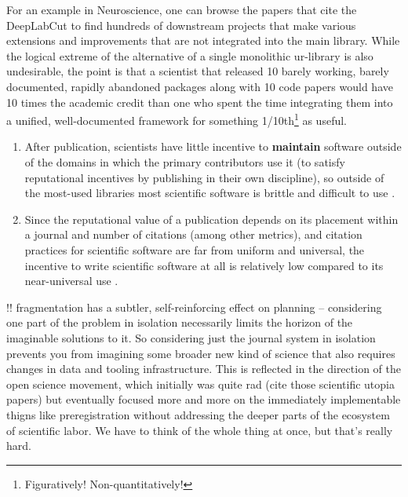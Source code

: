 \documentclass[10pt]{article}
\begin{document}
\begin{multicols}{2}
For an example in Neuroscience, one can browse the papers that cite the
DeepLabCut \cite{mathisDeepLabCutMarkerlessPose2018a}  to find
hundreds of downstream projects that make various extensions and
improvements that are not integrated into the main library. While the
logical extreme of the alternative of a single monolithic ur-library is
also undesirable, the point is that a scientist that released 10 barely
working, barely documented, rapidly abandoned packages along with 10
code papers would have 10 times the academic credit than one who spent
the time integrating them into a unified, well-documented framework for
something 1/10th\footnote{Figuratively! Non-quantitatively!} as useful.

\begin{enumerate}
\def\labelenumi{\arabic{enumi})}
\setcounter{enumi}{1}
\item
  After publication, scientists have little incentive to
  \textbf{maintain} software outside of the domains in which the primary
  contributors use it (to satisfy reputational incentives by publishing
  in their own discipline), so outside of the most-used libraries most
  scientific software is brittle and difficult to use \cite{mangulImprovingUsabilityArchival2019, kumarBioinformaticsSoftwareBiologists2007} .
\item
  Since the reputational value of a publication depends on its placement
  within a journal and number of citations (among other metrics), and
  citation practices for scientific software are far from uniform and
  universal, the incentive to write scientific software at all is
  relatively low compared to its near-universal use \cite{howisonSoftwareScientificLiterature2016} .
\end{enumerate}

!! fragmentation has a subtler, self-reinforcing effect on planning --
considering one part of the problem in isolation necessarily limits the
horizon of the imaginable solutions to it. So considering just the
journal system in isolation prevents you from imagining some broader new
kind of science that also requires changes in data and tooling
infrastructure. This is reflected in the direction of the open science
movement, which initially was quite rad (cite those scientific utopia
papers) but eventually focused more and more on the immediately
implementable thigns like preregistration without addressing the deeper
parts of the ecosystem of scientific labor. We have to think of the
whole thing at once, but that's really hard.


\end{multicols}
\end{document}
